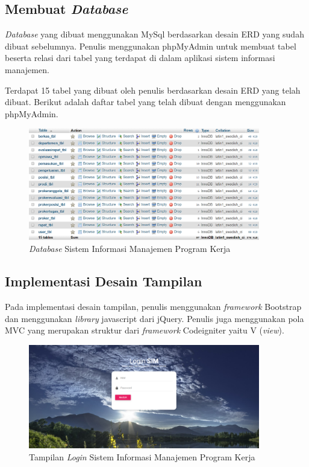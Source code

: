 \subsection{Membuat \textit{Database}}

\textit{Database} yang dibuat menggunakan MySql berdasarkan desain ERD yang sudah dibuat sebelumnya. Penulis menggunakan phpMyAdmin untuk membuat tabel beserta relasi dari tabel yang terdapat di dalam aplikasi sistem informasi manajemen.

Terdapat 15 tabel yang dibuat oleh penulis berdasarkan desain ERD yang telah dibuat. Berikut adalah daftar tabel yang telah dibuat dengan menggunakan phpMyAdmin.

\begin{figure}[H]
	\centering
	\includegraphics[width=0.9\textwidth]{gambar/database_phpmyadmin}
	\caption{\textit{Database} Sistem Informasi Manajemen Program Kerja}
	\label{Database_phpmyadmin}
\end{figure}

\subsection{Implementasi Desain Tampilan}

Pada implementasi desain tampilan, penulis menggunakan \textit{framework} Bootstrap dan menggunakan \textit{library} javascript dari jQuery. Penulis juga menggunakan pola MVC yang merupakan struktur dari \textit{framework} Codeigniter yaitu V (\textit{view}).

\begin{figure}[H]
	\centering
	\includegraphics[width=0.9\textwidth]{gambar/interface_login}
	\caption{ Tampilan \textit{Login} Sistem Informasi Manajemen Program Kerja}
	\label{Tampilan_login}
\end{figure}

